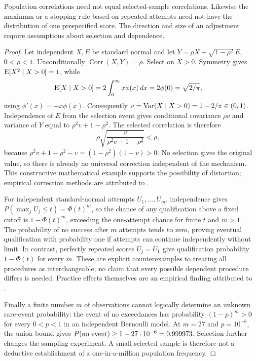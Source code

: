 \begin{proposition}
\label{hfpr:selection}
Population correlations need not equal selected-sample correlations.
Likewise the maximum or a stopping rule based on repeated attempts need
not have the distribution of one prespecified score. The direction and
size of an adjustment require assumptions about selection and dependence.
\end{proposition}
\begin{proof}
Let independent \(X,E\) be standard normal and let
\(Y=\rho X+\sqrt{1-\rho^2}\,E\), \(0<\rho<1\).
Unconditionally \(\operatorname{Corr}(X,Y)=\rho\).
Select on \(X>0\). Symmetry gives \(\operatorname{E}[X^2\mid X>0]=1\), while
\[
 \operatorname{E}[X\mid X>0]=2\int_0^\infty x\phi(x)\,dx
 =2\phi(0)=\sqrt{2/\pi},
\]
using \(\phi'(x)=-x\phi(x)\). Consequently
\(v=\operatorname{Var}(X\mid X>0)=1-2/\pi\in(0,1)\).
Independence of \(E\) from the selection event gives conditional
covariance \(\rho v\) and variance of \(Y\) equal to
\(\rho^2v+1-\rho^2\). The selected correlation is therefore
\[
 \rho\sqrt{\frac{v}{\rho^2v+1-\rho^2}}<\rho,
\]
because \(\rho^2v+1-\rho^2-v=(1-\rho^2)(1-v)>0\).
No selection gives the original value, so there is already no universal
correction independent of the mechanism. This constructive mathematical
example supports the possibility of distortion; empirical correction
methods are attributed to \citet{sackett2000}.

For independent standard-normal attempts \(U_1,\ldots,U_m\),
independence gives
\(P(\max_jU_j\leq t)=\Phi(t)^m\), so the chance of any qualification
above a fixed cutoff is \(1-\Phi(t)^m\), exceeding the one-attempt chance
for finite \(t\) and \(m>1\). The probability of no success after \(m\)
attempts tends to zero, proving eventual qualification with probability
one if attempts can continue independently without limit. In contrast,
perfectly repeated scores \(U_j=U_1\) give qualification probability
\(1-\Phi(t)\) for every \(m\). These are explicit counterexamples to
treating all procedures as interchangeable; no claim that every possible
dependent procedure differs is needed. Practice effects themselves are
an empirical finding attributed to \citet{hausknecht2007}.

Finally a finite number \(m\) of observations cannot logically determine
an unknown rare-event probability: the event of no exceedances has
probability \((1-p)^m>0\) for every \(0<p<1\) in an independent
Bernoulli model. At \(m=27\) and \(p=10^{-6}\), the union bound gives
\(P(\hbox{no event})\geq1-27\cdot10^{-6}=0.999973\).
Selection further changes the sampling experiment. A small selected
sample is therefore not a deductive establishment of a one-in-a-million
population frequency.
\end{proof}

